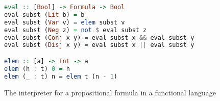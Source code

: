 \begin{figure}[h!]
  \begin{lstlisting}[language=Haskell, basicstyle=\small]
eval :: [Bool] -> Formula -> Bool 
eval subst (Lit b) = b 
eval subst (Var v) = elem subst v 
eval subst (Neg z) = not $ eval subst z 
eval subst (Conj x y) = eval subst x && eval subst y 
eval subst (Disj x y) = eval subst x || eval subst y 

elem :: [a] -> Int -> a
elem (h : t) 0 = h
elem (_ : t) n = elem t (n - 1)
  \end{lstlisting}
  \caption{The interpreter for a propositional formula in a functional language}
  \label{fig:chap1:propEval}
\end{figure}